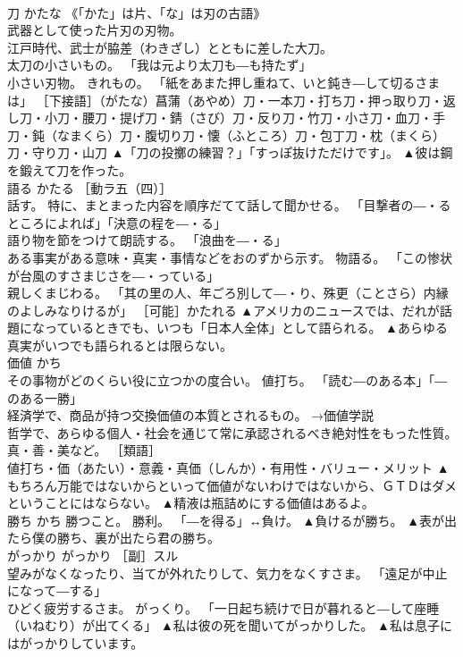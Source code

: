 \documentclass[8pt]{extreport}
\begin{document}
\begin{CJK}{UTF8}{min}
\\	刀	かたな	《「かた」は片、「な」は刃の古語》 
\\	武器として使った片刃の刃物。 
\\	江戸時代、武士が脇差（わきざし）とともに差した大刀。 
\\	太刀の小さいもの。 「我は元より太刀も―も持たず」 
\\	小さい刃物。 きれもの。 「紙をあまた押し重ねて、いと鈍き―して切るさまは」 ［下接語］（がたな）菖蒲（あやめ）刀・一本刀・打ち刀・押っ取り刀・返し刀・小刀・腰刀・提げ刀・錆（さび）刀・反り刀・竹刀・小さ刀・血刀・手刀・鈍（なまくら）刀・腹切り刀・懐（ふところ）刀・包丁刀・枕（まくら）刀・守り刀・山刀	▲「刀の投擲の練習？」「すっぽ抜けただけです」。 ▲彼は鋼を鍛えて刀を作った。
\\	語る	かたる	［動ラ五（四）］ 
\\	話す。 特に、まとまった内容を順序だてて話して聞かせる。 「目撃者の―・るところによれば」「決意の程を―・る」 
\\	語り物を節をつけて朗読する。 「浪曲を―・る」 
\\	ある事実がある意味・真実・事情などをおのずから示す。 物語る。 「この惨状が台風のすさまじさを―・っている」 
\\	親しくまじわる。 「其の里の人、年ごろ別して―・り、殊更（ことさら）内縁のよしみなりけるが」 ［可能］かたれる	▲アメリカのニュースでは、だれが話題になっているときでも、いつも「日本人全体」として語られる。 ▲あらゆる真実がいつでも語られるとは限らない。
\\	価値	かち	
\\	その事物がどのくらい役に立つかの度合い。 値打ち。 「読む―のある本」「―のある一勝」 
\\	経済学で、商品が持つ交換価値の本質とされるもの。 →価値学説 
\\	哲学で、あらゆる個人・社会を通じて常に承認されるべき絶対性をもった性質。 真・善・美など。 ［類語］
\\	値打ち・価（あたい）・意義・真価（しんか）・有用性・バリュー・メリット	▲もちろん万能ではないからといって価値がないわけではないから、ＧＴＤはダメということにはならない。 ▲精液は瓶詰めにする価値はあるよ。
\\	勝ち	かち	勝つこと。 勝利。 「―を得る」↔負け。	▲負けるが勝ち。 ▲表が出たら僕の勝ち、裏が出たら君の勝ち。
\\	がっかり	がっかり	［副］スル 
\\	望みがなくなったり、当てが外れたりして、気力をなくすさま。 「遠足が中止になって―する」 
\\	ひどく疲労するさま。 がっくり。 「一日起ち続けで日が暮れると―して座睡（いねむり）が出てくる」	▲私は彼の死を聞いてがっかりした。 ▲私は息子にはがっかりしています。

\end{CJK}
\end{document}
